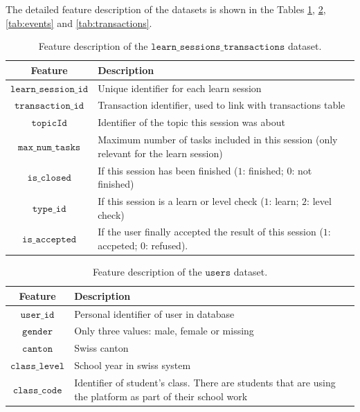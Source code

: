 \documentclass[sigplan,screen]{acmart}
\begin{document}
The detailed feature description of the datasets is shown in the Tables \ref{tab:learn}, \ref{tab:users}, \ref{tab:events} and \ref{tab:transactions}.

\begin{table}[!ht]
  \caption{Feature description of the $\texttt{learn\_sessions\_transactions}$ dataset.}
  \label{tab:learn}
  \begin{tabular}{cl}
    \toprule
    \textbf{Feature}&\textbf{Description}\\
    \midrule
    $\texttt{learn\_session\_id}$ & Unique identifier for each learn session \\
    $\texttt{transaction\_id}$ & Transaction identifier, used to link with transactions table \\
    $\texttt{topicId}$ & Identifier of the topic this session was about \\
    $\texttt{max\_num\_tasks}$ & Maximum number of tasks included in this session (only relevant for the learn session) \\
    $\texttt{is\_closed}$ & If this session has been finished ($1$: finished; $0$: not finished) \\
    $\texttt{type\_id}$ & If this session is a learn or level check ($1$: learn; $2$: level check) \\
    $\texttt{is\_accepted}$ & If the user finally accepted the result of this session ($1$: accpeted; $0$: refused). \\
    \bottomrule
    \end{tabular}
\end{table}

\begin{table}[!ht]
  \caption{Feature description of the $\texttt{users}$ dataset.}
  \label{tab:users}
  \begin{tabular}{cl}
    \toprule
    \textbf{Feature}&\textbf{Description}\\
    \midrule
    $\texttt{user\_id}$ & Personal identifier of user in database \\
    $\texttt{gender}$ & Only three values: male, female or missing \\
    $\texttt{canton}$ & Swiss canton \\
    $\texttt{class\_level}$ & School year in swiss system \\
    $\texttt{class\_code}$ & Identifier of student's class. There are students that are using the platform as part of their school work \\
    \bottomrule
    \end{tabular}
\end{table}
\end{document}
